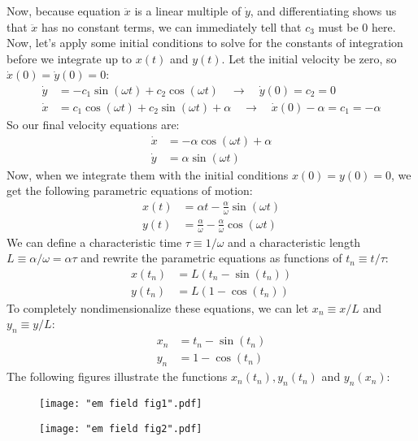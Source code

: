 \documentclass{article}
\begin{document}
Now, because equation $\ddot{x}$ is a linear multiple of $\dot{y}$, and differentiating shows us that $\ddot{x}$ has no constant terms, we can immediately tell that $c_3$ must be 0 here. Now, let's apply some initial conditions to solve for the constants of integration before we integrate up to $x(t)$ and $y(t)$. Let the initial velocity be zero, so $\dot{x}(0) = \dot{y}(0) = 0$:
\[
\begin{aligned}
\dot{y} &= -c_1 \sin(\omega t) + c_2 \cos(\omega t) \quad\longrightarrow\quad \dot{y}(0) = c_2 = 0 \\
\dot{x} &= c_1 \cos(\omega t) + c_2 \sin(\omega t) + \alpha \quad\longrightarrow\quad \dot{x}(0) -\alpha = c_1 = -\alpha
\end{aligned}
\]
So our final velocity equations are:
\[
\begin{aligned}
    \dot{x} &= -\alpha \cos(\omega t) + \alpha \\
    \dot{y} &= \alpha \sin(\omega t)
\end{aligned}
\]
Now, when we integrate them with the initial conditions $x(0) = y(0) = 0$, we get the following parametric equations of motion:
\[
\begin{aligned}
    x(t) &= \alpha t - \frac{\alpha}{\omega} \sin(\omega t) \\
    y(t) &= \frac{\alpha}{\omega} - \frac{\alpha}{\omega} \cos(\omega t)
\end{aligned}
\]
We can define a characteristic time $\tau \equiv 1/\omega$ and a characteristic length $L \equiv \alpha/\omega = \alpha \tau$ and rewrite the parametric equations as functions of $t_n \equiv t/\tau$:
\[
\begin{aligned}
    x(t_n) &= L(t_n - \sin(t_n)) \\
    y(t_n) &= L(1 - \cos(t_n))
\end{aligned}
\]
To completely nondimensionalize these equations, we can let $x_n \equiv x/L$ and $y_n \equiv y/L$:
\[
\begin{aligned}
    x_n &= t_n - \sin(t_n) \\
    y_n &= 1 - \cos(t_n)
\end{aligned}
\]
The following figures illustrate the functions $x_n (t_n), y_n (t_n)$ and $y_n (x_n)$:
\begin{figure}[H]
\centering
\begin{minipage}{.5\textwidth}
    \centering
    \texttt{[image: "em field fig1".pdf]}
\end{minipage}%
\begin{minipage}{.5\textwidth}
    \centering
    \texttt{[image: "em field fig2".pdf]}
\end{minipage}
\end{figure}
\end{document}
